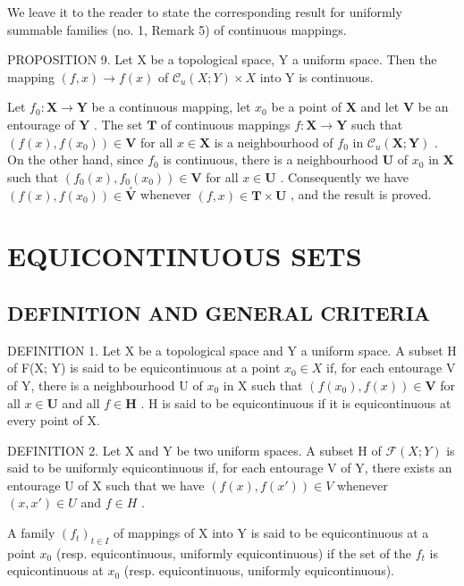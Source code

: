 We leave it to the reader to state the corresponding result for uniformly summable families (no. 1, Remark 5) of continuous mappings.

PROPOSITION 9. Let X be a topological space, Y a uniform space. Then the mapping \((f, x) \to f(x)\) of \(\mathcal{C}_u(X; Y) \times X\) into Y is continuous.

Let \(f_0: \mathbf{X} \to \mathbf{Y}\) be a continuous mapping, let \(x_0\) be a point of \(\mathbf{X}\) and let \(\mathbf{V}\) be an entourage of \(\mathbf{Y}\) . The set \(\mathbf{T}\) of continuous mappings \(f: \mathbf{X} \to \mathbf{Y}\) such that \((f(x), f(x_0)) \in \mathbf{V}\) for all \(x \in \mathbf{X}\) is a neighbourhood of \(f_0\) in \(\mathcal{C}_u(\mathbf{X}; \mathbf{Y})\) . On the other hand, since \(f_0\) is continuous, there is a neighbourhood \(\mathbf{U}\) of \(x_0\) in \(\mathbf{X}\) such that \((f_0(x), f_0(x_0)) \in \mathbf{V}\) for all \(x \in \mathbf{U}\) . Consequently we have \((f(x), f(x_0)) \in \overset{\circ}{\mathbf{V}}\) whenever \((f, x) \in \mathbf{T} \times \mathbf{U}\) , and the result is proved.

\section{EQUICONTINUOUS SETS}

\subsection{DEFINITION AND GENERAL CRITERIA}

DEFINITION 1. Let X be a topological space and Y a uniform space. A subset H of F(X; Y) is said to be equicontinuous at a point \(x_{0} \in X\) if, for each entourage V of Y, there is a neighbourhood U of \(x_{0}\) in X such that \((f(x_{0}),f(x))\in\mathbf{V}\) for all \(x\in\mathbf{U}\) and all \(f\in\mathbf{H}\) . H is said to be equicontinuous if it is equicontinuous at every point of X.

DEFINITION 2. Let X and Y be two uniform spaces. A subset H of \(\mathcal{F}(X;Y)\) is said to be uniformly equicontinuous if, for each entourage V of Y, there exists an entourage U of X such that we have \((f(x), f(x')) \in V\) whenever \((x, x') \in U\) and \(f \in H\) .

A family \((f_{t})_{t\in I}\) of mappings of X into Y is said to be equicontinuous at a point \(x_0\) (resp. equicontinuous, uniformly equicontinuous) if the set of the \(f_{t}\) is equicontinuous at \(x_0\) (resp. equicontinuous, uniformly equicontinuous).

